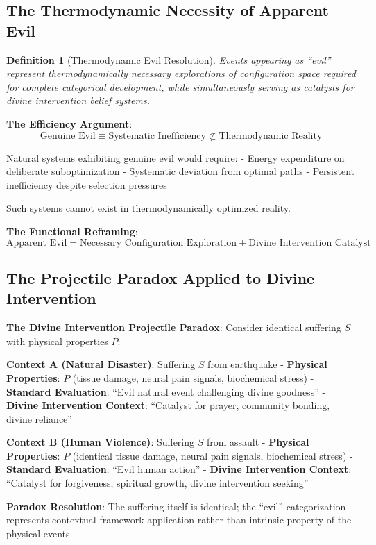 \documentclass[12pt,a4paper]{article}
\newtheorem{definition}[theorem]{Definition}
\begin{document}
\subsection{The Thermodynamic Necessity of Apparent Evil}

\begin{definition}[Thermodynamic Evil Resolution]
Events appearing as ``evil'' represent thermodynamically necessary explorations of configuration space required for complete categorical development, while simultaneously serving as catalysts for divine intervention belief systems.
\end{definition}

\textbf{The Efficiency Argument}:
$$\text{Genuine Evil} \equiv \text{Systematic Inefficiency} \not\subset \text{Thermodynamic Reality}$$

Natural systems exhibiting genuine evil would require:
- Energy expenditure on deliberate suboptimization
- Systematic deviation from optimal paths
- Persistent inefficiency despite selection pressures

Such systems cannot exist in thermodynamically optimized reality.

\textbf{The Functional Reframing}:
$$\text{Apparent Evil} = \text{Necessary Configuration Exploration} + \text{Divine Intervention Catalyst}$$

\subsection{The Projectile Paradox Applied to Divine Intervention}

\textbf{The Divine Intervention Projectile Paradox}:
Consider identical suffering $S$ with physical properties $P$:

\textbf{Context A (Natural Disaster)}: Suffering $S$ from earthquake
- \textbf{Physical Properties}: $P$ (tissue damage, neural pain signals, biochemical stress)
- \textbf{Standard Evaluation}: ``Evil natural event challenging divine goodness''
- \textbf{Divine Intervention Context}: ``Catalyst for prayer, community bonding, divine reliance''

\textbf{Context B (Human Violence)}: Suffering $S$ from assault  
- \textbf{Physical Properties}: $P$ (identical tissue damage, neural pain signals, biochemical stress)
- \textbf{Standard Evaluation}: ``Evil human action''
- \textbf{Divine Intervention Context}: ``Catalyst for forgiveness, spiritual growth, divine intervention seeking''

\textbf{Paradox Resolution}: The suffering itself is identical; the ``evil'' categorization represents contextual framework application rather than intrinsic property of the physical events.
\end{document}
